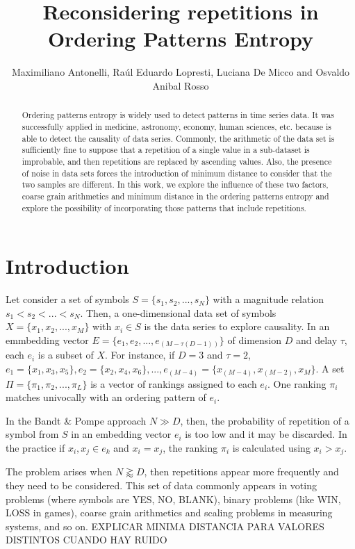 \documentclass[twocolumn]{article}
\title{Reconsidering repetitions in Ordering Patterns Entropy}
\author{Maximiliano Antonelli, Raúl Eduardo Lopresti, Luciana De Micco and Osvaldo Anibal Rosso}
\begin{document}
\maketitle

\begin{abstract}
Ordering patterns entropy is widely used to detect patterns in time series data. It was successfully applied in medicine, astronomy, economy, human sciences, etc. because is able to detect the causality of data series. Commonly, the arithmetic of the data set is sufficiently fine to suppose that a repetition of a single value in a sub-dataset is improbable, and then repetitions are replaced by ascending values. Also, the presence of noise in data sets forces the introduction of minimum distance to consider that the two samples are different. In this work, we explore the influence of these two factors, coarse grain arithmetics and minimum distance in the ordering patterns entropy and explore the possibility of incorporating those patterns that include repetitions.
\end{abstract}

\section{Introduction}

Let consider a set of symbols $S = \{s_1, s_2, ..., s_N \}$ with a magnitude relation $s_1 < s_2 < ... < s_N$.
Then, a one-dimensional data set of symbols $X = \{x_1, x_2, ..., x_M\}$ with $x_i \in S$ is the data series to explore causality.
In an emmbedding vector $E = \{e_1, e_2, ..., e_{(M-\tau(D-1))}\}$ of dimension $D$ and delay $\tau$, each $e_i$ is a subset of $X$. For instance, if $D = 3$ and $\tau = 2$, $e_1 = \{x_1, x_3, x_5\}, e_2 = \{x_2, x_4, x_6\}, ..., e_{(M-4)} = \{x_{(M-4)}, x_{(M-2)}, x_M\}$.
A set $\Pi = \{\pi_1, \pi_2, ..., \pi_L\}$ is a vector of rankings assigned to each $e_i$. One ranking $\pi_i$ matches univocally with an ordering pattern of $e_i$.

In the Bandt \& Pompe approach \cite{Bandt2002} $N \gg D$, then, the probability of repetition of a symbol from $S$ in an embedding vector $e_i$ is too low and it may be discarded.
In the practice if ${x_i, x_j} \in e_k$ and $x_i = x_j$, the ranking $\pi_i$ is calculated using $x_i > x_j$.

The problem arises when $N \gtrapprox D$, then repetitions appear more frequently and they need to be considered. This set of data commonly appears in voting problems (where symbols are YES, NO, BLANK), binary problems (like WIN, LOSS in games), coarse grain arithmetics and scaling problems in measuring systems, and so on. EXPLICAR MINIMA DISTANCIA PARA VALORES DISTINTOS CUANDO HAY RUIDO
\end{document}
